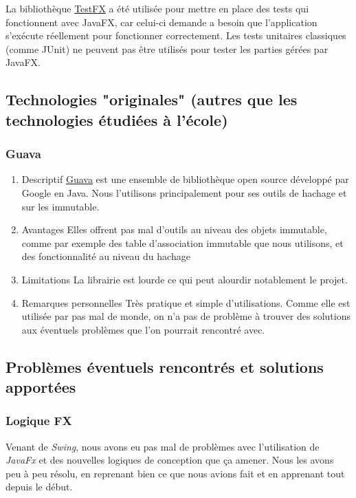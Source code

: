 \documentclass[a4paper,12pt]{article}
\begin{document}
	La bibliothèque \href{https://github.com/TestFX/TestFX}{TestFX} a été utilisée pour mettre en place des tests qui fonctionnent avec JavaFX, car celui-ci demande a besoin que l'application s'exécute réellement pour fonctionner correctement. Les tests unitaires classiques (comme JUnit) ne peuvent pas être utilisés pour tester les parties gérées par JavaFX.
	
	
	\subsection{Technologies "originales" (autres que les technologies étudiées à l'école)}
	
	\subsubsection{Guava}
	\begin{enumerate}
		\item Descriptif
		\href{https://github.com/google/guava}{Guava} est une ensemble de bibliothèque open source développé par Google en Java. Nous l'utilisons principalement pour ses outils de hachage et sur les immutable.
		\item Avantages
		Elles offrent pas mal d'outils au niveau des objets immutable, comme par exemple des table d'association immutable que nous utilisons, et des fonctionnalité au niveau du hachage
		\item Limitations
		La librairie est lourde ce qui peut alourdir notablement le projet.
		\item Remarques personnelles
		Très pratique et simple d'utilisations. Comme elle est utilisée par pas mal de monde, on n'a pas de problème à trouver des solutions aux éventuels problèmes que l'on pourrait rencontré avec.
	\end{enumerate}
	
	\subsection{Problèmes éventuels rencontrés et solutions apportées}
	
	\subsubsection{Logique FX }
	Venant de \textit{Swing}, nous avons eu pas mal de problèmes avec l'utilisation de \textit{JavaFx} et des nouvelles logiques de conception que ça amener. Nous les avons peu à peu résolu, en reprenant bien ce que nous avions fait et en apprenant tout depuis le début.
	
\end{document}
